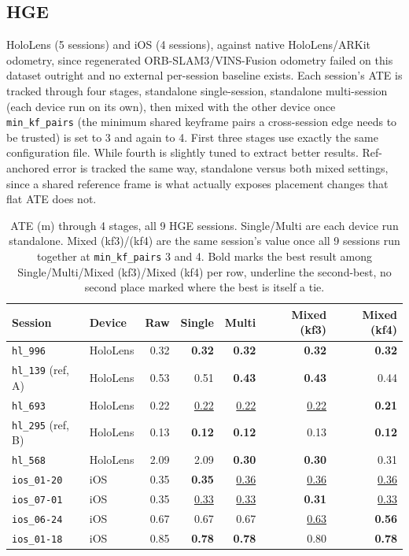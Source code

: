 \subsection{HGE}
\label{sec:experiments-main-hge}

HoloLens (5 sessions) and iOS (4 sessions), against native HoloLens/ARKit odometry, since
regenerated ORB-SLAM3/VINS-Fusion odometry failed on this dataset outright and no external
per-session baseline exists. Each session's ATE is tracked through four stages, standalone
single-session, standalone multi-session (each device run on its own), then mixed with the other
device once \texttt{min\_kf\_pairs} (the minimum shared keyframe pairs a cross-session edge needs
to be trusted) is set to 3 and again to 4. First three stages use exactly the same configuration file. While fourth is slightly tuned to extract better results. Ref-anchored error is tracked the same way, standalone versus both mixed settings, since a shared reference frame is what actually exposes placement
changes that flat ATE does not.

\begin{table}[htb]
  \centering
  \footnotesize
  \begin{tabular*}{\textwidth}{@{\extracolsep{\fill}} llrrrrr}
  \hline
  \textbf{Session} & \textbf{Device} & \textbf{Raw} & \textbf{Single} & \textbf{Multi} & \textbf{Mixed (kf3)} & \textbf{Mixed (kf4)} \\
  \hline
  \texttt{hl\_996} & HoloLens & 0.32 & \textbf{0.32} & \textbf{0.32} & \textbf{0.32} & \textbf{0.32} \\
  \texttt{hl\_139} (ref, A) & HoloLens & 0.53 & 0.51 & \textbf{0.43} & \textbf{0.43} & 0.44 \\
  \texttt{hl\_693} & HoloLens & 0.22 & \underline{0.22} & \underline{0.22} & \underline{0.22} & \textbf{0.21} \\
  \texttt{hl\_295} (ref, B) & HoloLens & 0.13 & \textbf{0.12} & \textbf{0.12} & 0.13 & \textbf{0.12} \\
  \texttt{hl\_568} & HoloLens & 2.09 & 2.09 & \textbf{0.30} & \textbf{0.30} & 0.31 \\
  \texttt{ios\_01-20} & iOS & 0.35 & \textbf{0.35} & \underline{0.36} & \underline{0.36} & \underline{0.36} \\
  \texttt{ios\_07-01} & iOS & 0.35 & \underline{0.33} & \underline{0.33} & \textbf{0.31} & \underline{0.33} \\
  \texttt{ios\_06-24} & iOS & 0.67 & 0.67 & 0.67 & \underline{0.63} & \textbf{0.56} \\
  \texttt{ios\_01-18} & iOS & 0.85 & \textbf{0.78} & \textbf{0.78} & 0.80 & \textbf{0.78} \\
  \hline
  \end{tabular*}
  \caption[HGE ATE progression, all 9 sessions]{ATE (m) through 4 stages, all 9 HGE sessions.
    Single/Multi are each device run standalone. Mixed (kf3)/(kf4) are the same session's value once all 9 sessions run together at \texttt{min\_kf\_pairs} 3 and 4. Bold marks the best result among Single/Multi/Mixed (kf3)/Mixed (kf4) per row, underline the second-best, no second place marked where the best is itself a tie.}
  \label{tab:experiments-hge-ate}
\end{table}

